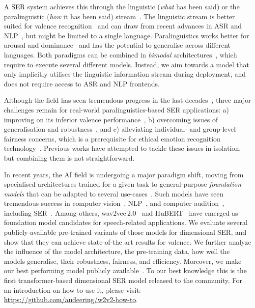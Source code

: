 \documentclass{article}
\newcommand{\review}[1]{\textcolor{black}{#1}}
\newcommand\release{\mbox{\url{https://github.com/audeering/w2v2-how-to}}}
\newcommand{\wtov}{wav2vec\,2.0}
\newcommand{\hubert}{HuBERT}
\begin{document}
A \ac{SER} system achieves this through the linguistic (\emph{what} has been said) or the paralinguistic (\emph{how} it has been said) stream~\citep{Schuller18-SER, atmaja2022survey, pantic2009survey}.
The linguistic stream is better suited for valence recognition~\citep{calvo2010affect, sewa2021}
and can draw from recent advances in \ac{ASR} and \ac{NLP}~\citep{sahu2019multi},
but might be limited to a single language. 
Paralinguistics works better for arousal and dominance~\citep{calvo2010affect, sewa2021}
and has the potential to generalise across different languages.
Both paradigms
can be combined in \emph{bimodal} architectures~\citep{atmaja2022survey},
which require to execute several different models.
Instead, 
we aim towards a model that only implicitly utilises the linguistic information stream during deployment,
and does not require access to \ac{ASR} and \ac{NLP} frontends.

Although the field has seen tremendous progress in the last decades~\citep{Schuller18-SER},
three major challenges remain for real-world paralinguistics-based \ac{SER} applications:
a)
improving on its inferior valence performance~\citep{sewa2021, triantafyllopoulos2021multistage},
b)
overcoming issues of generalisation and robustness~\citep{Oates19-RSE, Triantafyllopoulos19-TRS}, and
c)
alleviating individual- and group-level fairness concerns, which is a prerequisite for ethical emotion recognition technology~\citep{batliner2020ethics, cheong2021hitchhiker}.
Previous works have attempted to tackle these issues in isolation,
but combining them is not straightforward.

In recent years,
the \ac{AI} field is undergoing a major paradigm shift,
moving from specialised architectures trained for a given task
to general-purpose \emph{foundation models}
that can be adapted to several use-cases~\citep{bommasani2021opportunities}.
Such models have seen tremendous success in computer vision~\citep{chen2020simple, han2022survey},
\ac{NLP}~\citep{vaswani2017attention},
and computer audition~\citep{baevski2020wav2vec, hsu2021hubert},
including \ac{SER}~\citep{wang2021finetuned, Latif21-SOD}.
Among others,
{\wtov}~\citep{baevski2020wav2vec}
and {\hubert}~\citep{hsu2021hubert}
have emerged as foundation model candidates for speech-related applications.
We evaluate several publicly-available pre-trained
variants of those models
for dimensional \ac{SER},
and show that they can achieve state-of-the art results for valence.
We further analyze the influence of the model architecture, the 
\review{pre-}training data,
how well the models generalise,
their robustness,
fairness,
and efficiency.
Moreover,
we make our best performing model publicly available~\citep{wagner2022model}.
To our best knowledge
this is the first transformer-based dimensional \ac{SER} model released to the community.
For an introduction on how to use it,
please visit: {\release}.
\end{document}
